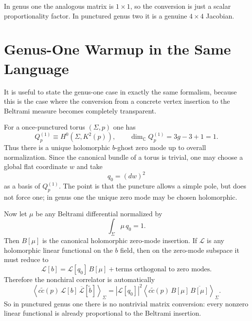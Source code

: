\documentclass[12pt]{article}
\newcommand{\cL}{\mathcal{L}}
\newcommand{\bC}{\mathbb{C}}
\newcommand{\wt}[1]{\widetilde{#1}}
\newcommand{\ol}[1]{\overline{#1}}
\begin{document}
In genus one the analogous matrix is $1\times 1$, so the conversion is just a scalar proportionality factor. In punctured genus two it is a genuine $4\times 4$ Jacobian.

\section{Genus-One Warmup in the Same Language}

It is useful to state the genus-one case in exactly the same formalism, because this is the case where the conversion from a concrete vertex insertion to the Beltrami measure becomes completely transparent.

For a once-punctured torus $(\Sigma,p)$ one has
\begin{equation}
Q_p^{(1)} \equiv H^0(\Sigma,K^2(p)),
\qquad
\dim_{\bC} Q_p^{(1)} = 3g-3+1 = 1.
\end{equation}
Thus there is a unique holomorphic $b$-ghost zero mode up to overall normalization. Since the canonical bundle of a torus is trivial, one may choose a global flat coordinate $w$ and take
\begin{equation}
q_0 = (dw)^2
\end{equation}
as a basis of $Q_p^{(1)}$. The point is that the puncture allows a simple pole, but does not force one; in genus one the unique zero mode may be chosen holomorphic.

Now let $\mu$ be any Beltrami differential normalized by
\begin{equation}
\int_{\Sigma} \mu\, q_0 = 1.
\end{equation}
Then $B[\mu]$ is the canonical holomorphic zero-mode insertion. If $\cL$ is any holomorphic linear functional on the $b$ field, then on the zero-mode subspace it must reduce to
\begin{equation}
\cL[b] = \cL[q_0]\, B[\mu] + \text{terms orthogonal to zero modes}.
\end{equation}
Therefore the nonchiral correlator is automatically
\begin{equation}
\left\langle c\wt{c}(p)\,\cL[b]\,\ol{\cL}[\wt{b}]\right\rangle_{\Sigma}
= |\cL[q_0]|^2
\left\langle c\wt{c}(p)\,B[\mu]\,\ol{B[\mu]}\right\rangle_{\Sigma}.
\label{eq:genusonebasic}
\end{equation}
So in punctured genus one there is no nontrivial matrix conversion: every nonzero linear functional is already proportional to the Beltrami insertion.
\end{document}
